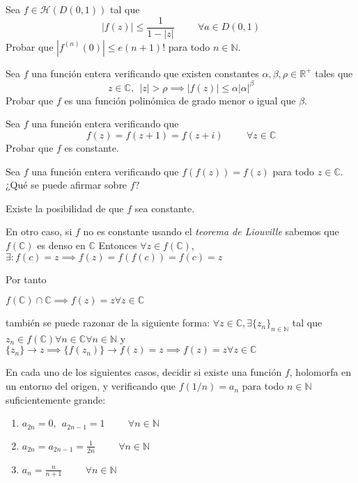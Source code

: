 \begin{ejer}
	Sea $f\in\mathcal{H}(D(0,1))$ tal que
	$$ |f(z)| \leq \frac{1}{1-|z|} \hspace{1cm} \forall a\in D(0,1) $$
	Probar que $|f^{(n)}(0)| \leq e(n+1)!$ para todo $n\in\mathbb{N}$.
\end{ejer}

\begin{ejer}
	Sea $f$ una función entera verificando que existen constantes $\alpha,\beta,\rho\in\mathbb{R}^+$ tales que
	$$ z\in\mathbb{C}, \ \ |z|>\rho \implies |f(z)| \leq \alpha |\alpha|^{\beta} $$
	Probar que $f$ es una función polinómica de grado menor o igual que $\beta$.
\end{ejer}

\begin{ejer}
	Sea $f$ una función entera verificando que
	$$ f(z) = f(z+1)=f(z+i) \hspace{1cm} \forall z\in\mathbb{C} $$
	Probar que $f$ es constante.
\end{ejer}

\begin{ejer}
	Sea $f$ una función entera verificando que $f(f(z))=f(z)$ para todo $z\in\mathbb{C}$. ¿Qué se puede afirmar sobre $f$?
\end{ejer}
\begin{sol}
Existe la posibilidad de que $f$ sea constante.

En otro caso, si $f$ no es constante usando el \textit{teorema de Liouville} sabemos que $f(\mathbb{C})$ es denso en $\mathbb{C}$
Entonces
$\forall z\in f(\mathbb{C})$, $\exists  : f(c)=z \implies f(z) = f(f(c)) = f(c) = z$


Por tanto

$f(\mathbb{C}) \cap \mathbb{C} \implies f(z)=z \forall z\in \mathbb{C}$

también se puede razonar de la siguiente forma:
$\forall z\in\mathbb{C}, \exists \{z_n\}_{n\in\mathbb{N}}$ tal que 
$z_n\in f(\mathbb{C}) \forall n\in\mathbb{C} \forall n\in\mathbb{N}$ y $\{z_n\}\rightarrow z \implies \{f(z_n)\}\rightarrow f(z)=z \implies f(z)=z \forall z\in\mathbb{C}$
\end{sol}

\begin{ejer}
	En cada uno de los siguientes casos, decidir si existe una función $f$, holomorfa en un entorno del origen, y verificando que $f(1/n)=a_n$ para todo $n\in\mathbb{N}$ suficientemente grande:
	\begin{enumerate}[label=(\alph*)]
		\item $a_{2n} = 0, \ \ a_{2n-1}=1 \hspace{1cm} \forall n\in\mathbb{N}$
		\item $a_{2n} = a_{2n-1} = \frac{1}{2n} \hspace{1cm} \forall n\in\mathbb{N}$
		\item $a_n = \frac{n}{n+1} \hspace{1cm} \forall n\in\mathbb{N}$
	\end{enumerate}
\end{ejer}

